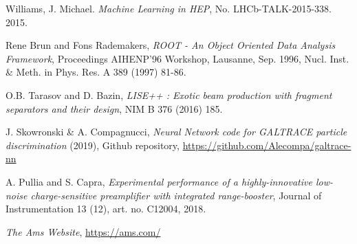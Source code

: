 \begin{thebibliography}{20}
  Williams, J. Michael. \emph{Machine Learning in HEP}, No. LHCb-TALK-2015-338. 2015.

  Rene Brun and Fons Rademakers,
  \emph{ROOT - An Object Oriented Data Analysis Framework}, Proceedings AIHENP'96 Workshop, Lausanne, Sep. 1996, Nucl. Inst. \& Meth. in Phys. Res. A 389 (1997) 81-86.

  O.B. Tarasov and D. Bazin,
  \emph{LISE++ : Exotic beam production with fragment separators and their design}, NIM B 376 (2016) 185.

  J. Skowronski \& A. Compagnucci,
  \emph{Neural Network code for GALTRACE particle discrimination} (2019), Github repository, \url{https://github.com/Alecompa/galtrace-nn}

  A. Pullia and S. Capra,
  \emph{Experimental performance of a highly-innovative low-noise charge-sensitive preamplifier with integrated range-booster}, Journal of Instrumentation 13 (12), art. no. C12004, 2018.

  \emph{The Ams Website}, \url{https://ams.com/}

\end{thebibliography}
